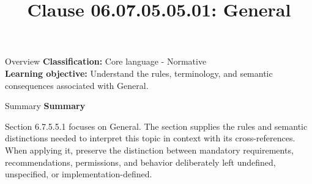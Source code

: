 \documentclass[10pt,letterpaper]{article}
\title{Clause 06.07.05.05.01: General}
\author{}
\date{}
\begin{document}
\maketitle
\begin{CornellOverviewBox}{Overview}
\textbf{Classification:} Core language - Normative\\[2pt]
\textbf{Learning objective:} Understand the rules, terminology, and semantic consequences associated with General.
\end{CornellOverviewBox}\begin{CornellSummaryBox}{Summary}
{\sffamily\bfseries\color{Accent} Summary}\par\vspace{3pt}Section 6.7.5.5.1 focuses on General. The section supplies the rules and semantic distinctions needed to interpret this topic in context with its cross-references. When applying it, preserve the distinction between mandatory requirements, recommendations, permissions, and behavior deliberately left undefined, unspecified, or implementation-defined.
\end{CornellSummaryBox}
\end{document}

